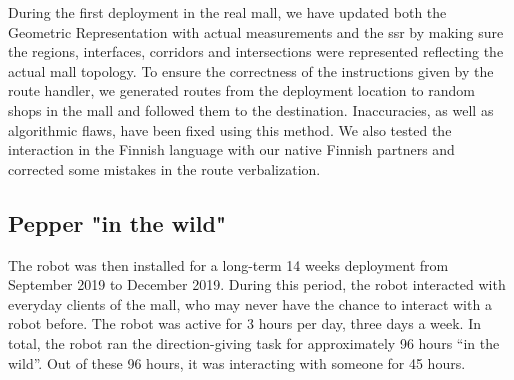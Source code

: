 During the first deployment in the real mall, we have updated both the Geometric Representation with actual measurements and the \acrfull{ssr} by making sure the regions, interfaces, corridors and intersections were represented reflecting the actual mall topology. To ensure the correctness of the instructions given by the route handler, we generated routes from the deployment location to random shops in the mall and followed them to the destination. Inaccuracies, as well as algorithmic flaws, have been fixed using this method. We also tested the interaction in the Finnish language with our native Finnish partners and corrected some mistakes in the route verbalization.

\subsection{Pepper "in the wild"}

The robot was then installed for a long-term 14 weeks deployment from September 2019 to December 2019. During this period, the robot interacted with everyday clients of the mall, who may never have the chance to interact with a robot before. The robot was active for 3 hours per day, three days a week. In total, the robot ran the direction-giving task for approximately 96 hours ``in the wild''. Out of these 96 hours, it was interacting with someone for 45 hours.
